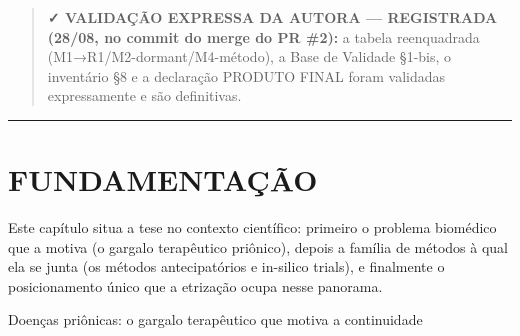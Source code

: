 \documentclass[12pt,a4paper,oneside]{report}
\begin{document}
\begin{quote}
\textbf{✓ VALIDAÇÃO EXPRESSA DA AUTORA --- REGISTRADA (28/08, no commit
do merge do PR \#2):} a tabela reenquadrada
(M1→R1/M2-dormant/M4-método), a Base de Validade §1-bis, o inventário §8
e a declaração PRODUTO FINAL foram validadas expressamente e são
definitivas.
\end{quote}

\begin{center}\rule{0.5\linewidth}{0.5pt}\end{center}

\hypertarget{fundamentauxe7uxe3o}{%
\chapter{FUNDAMENTAÇÃO}\label{fundamentauxe7uxe3o}}

Este capítulo situa a tese no contexto científico: primeiro o problema
biomédico que a motiva (o gargalo terapêutico priônico), depois a
família de métodos à qual ela se junta (os métodos antecipatórios e
in-silico trials), e finalmente o posicionamento único que a etrização
ocupa nesse panorama.

Doenças priônicas: o gargalo terapêutico que motiva a continuidade
\end{document}
